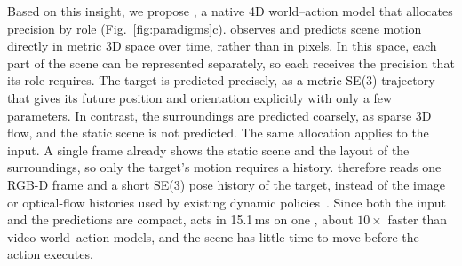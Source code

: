 
Based on this insight, we propose \textbf{\ours}, a native 4D world--action model that allocates precision by role (Fig.~\ref{fig:paradigms}c). 
\ours observes and predicts scene motion directly in metric 3D space over time, rather than in pixels. 
In this space, each part of the scene can be represented separately, so each receives the precision that its role requires. 
The target is predicted precisely, as a metric SE(3) trajectory that gives its future position and orientation explicitly with only a few parameters. 
In contrast, the surroundings are predicted coarsely, as sparse 3D flow, and the static scene is not predicted. 
The same allocation applies to the input. 
A single frame already shows the static scene and the layout of the surroundings, so only the target's motion requires a history. 
\ours therefore reads one RGB-D frame and a short SE(3) pose history of the target, instead of the image or optical-flow
histories used by existing dynamic policies~\cite{dynamicvla,domino,dynamicwam}.
Since both the input and the predictions are compact, \ours acts in 15.1\,ms on one \cfgGPU{}, about $10\times$ faster than video world--action models, and the scene has little time to move before the action executes.




